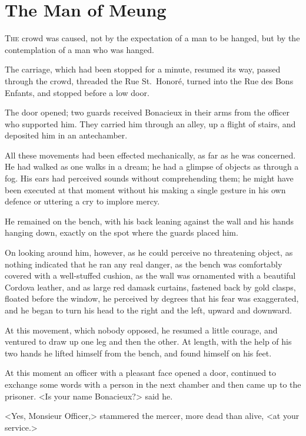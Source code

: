 
\chapter{The Man of Meung}

\lettrine{T}{he} crowd was caused, not by the expectation of a man to be hanged, but by the contemplation of a man who was hanged. 

\zz
The carriage, which had been stopped for a minute, resumed its way, passed through the crowd, threaded the Rue St.~Honoré, turned into the Rue des Bons Enfants, and stopped before a low door. 

The door opened; two guards received Bonacieux in their arms from the officer who supported him. They carried him through an alley, up a flight of stairs, and deposited him in an antechamber. 

All these movements had been effected mechanically, as far as he was concerned. He had walked as one walks in a dream; he had a glimpse of objects as through a fog. His ears had perceived sounds without comprehending them; he might have been executed at that moment without his making a single gesture in his own defence or uttering a cry to implore mercy. 

He remained on the bench, with his back leaning against the wall and his hands hanging down, exactly on the spot where the guards placed him. 

On looking around him, however, as he could perceive no threatening object, as nothing indicated that he ran any real danger, as the bench was comfortably covered with a well-stuffed cushion, as the wall was ornamented with a beautiful Cordova leather, and as large red damask curtains, fastened back by gold clasps, floated before the window, he perceived by degrees that his fear was exaggerated, and he began to turn his head to the right and the left, upward and downward. 

At this movement, which nobody opposed, he resumed a little courage, and ventured to draw up one leg and then the other. At length, with the help of his two hands he lifted himself from the bench, and found himself on his feet. 

At this moment an officer with a pleasant face opened a door, continued to exchange some words with a person in the next chamber and then came up to the prisoner. <Is your name Bonacieux?> said he. 

<Yes, Monsieur Officer,> stammered the mercer, more dead than alive, <at your service.> 

